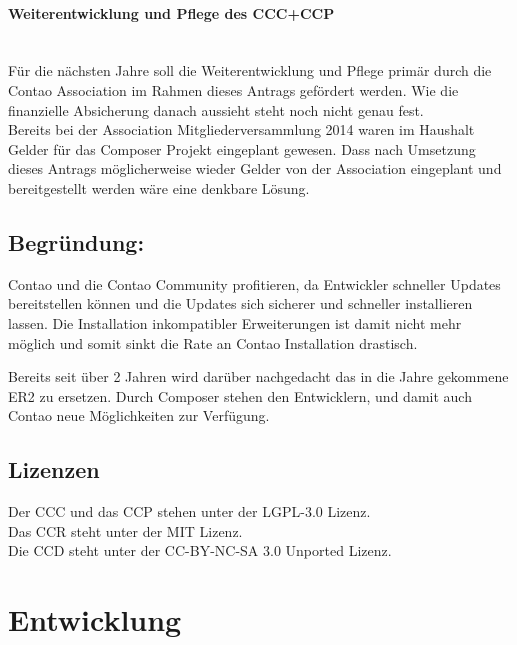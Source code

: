\documentclass[
paper=a4,
draft=false,%
fontsize=10pt%
]{scrartcl}
\begin{document}
\paragraph{Weiterentwicklung und Pflege des CCC+CCP} ~\\
Für die nächsten Jahre soll die Weiterentwicklung und Pflege primär durch die Contao Association im Rahmen dieses Antrags gefördert werden. Wie die finanzielle Absicherung danach aussieht steht noch nicht genau fest.\\
Bereits bei der Association Mitgliederversammlung 2014 waren im Haushalt Gelder für das Composer Projekt eingeplant gewesen. Dass nach Umsetzung dieses Antrags möglicherweise wieder Gelder von der Association eingeplant und bereitgestellt werden wäre eine denkbare Lösung.

\subsection{Begründung: }

Contao und die Contao Community profitieren, da Entwickler schneller Updates bereitstellen können und die Updates sich sicherer und schneller installieren lassen. Die Installation inkompatibler Erweiterungen ist damit nicht mehr möglich und somit sinkt die Rate an  Contao Installation drastisch.

Bereits seit über 2 Jahren wird darüber nachgedacht das in die Jahre gekommene ER2 zu ersetzen. Durch Composer stehen den Entwicklern, und damit auch Contao neue Möglichkeiten zur Verfügung.

\subsection{Lizenzen}

Der CCC und das CCP stehen unter der LGPL-3.0 Lizenz.\\
Das CCR steht unter der MIT Lizenz. \\
Die CCD steht unter der CC-BY-NC-SA 3.0 Unported Lizenz.

%
%

\newpage

\section{Entwicklung}
\end{document}
